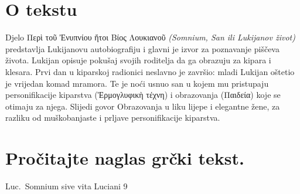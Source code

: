 

\section*{O tekstu}

Djelo \textgreek[variant=ancient]{Περὶ τοῦ Ἐνυπνίου ἤτοι Βίος Λουκιανοῦ} \textit{(Somnium, San ili Lukijanov život)} predstavlja Lukijanovu autobiografiju i glavni je izvor za poznavanje piščeva života. Lukijan opisuje pokušaj svojih roditelja da ga obrazuju za kipara i klesara. Prvi dan u kiparskoj radionici neslavno je završio: mladi Lukijan oštetio je vrijedan komad mramora. Te je noći usnuo san u kojem mu pristupaju personifikacije kiparstva \textgreek[variant=ancient]{(Ἑρμογλυφικὴ τέχνη)} i obrazovanja \textgreek[variant=ancient]{(Παιδεία)} koje se otimaju za njega. Slijedi govor Obrazovanja u liku lijepe i elegantne žene, za razliku od muškobanjaste i prljave personifikacije kiparstva.

\section*{Pročitajte naglas grčki tekst.}

Luc.\ Somnium sive vita Luciani 9


\medskip


